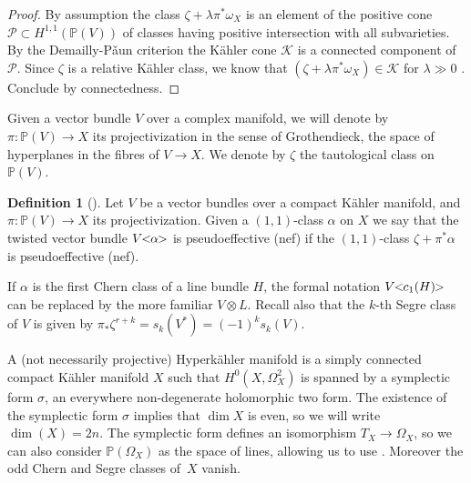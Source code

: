 \documentclass[JEP,XML,SOM,Unicode,NoEqCountersInSection,published]{cedram}
\let\mathcal\mathscr
\theoremstyle{plain}
\theoremstyle{definition}
\newtheorem{definition}[theorem]{Definition}
\newcommand{\PP}{\ensuremath{\mathbb{P}}}
\newcommand{\holom}[3]{\ensuremath{#1:#2\to #3}}
\begin{document}
\begin{proof}
By assumption the class $\zeta+ \lambda \pi^* \omega_X$ is an element of the
positive cone $\mathcal P \subset H^{1,1}(\PP(V))$ of classes having positive intersection with all subvarieties. By the Demailly-P\v aun criterion \cite[Th.\,0.1]{DP04}
the Kähler cone $\mathcal K$ is a connected component of $\mathcal P$.
Since $\zeta$ is a relative Kähler class, we know that $(\zeta+ \lambda \pi^* \omega_X) \in \mathcal K$ for $\lambda \gg 0$ \cite[Proof of Prop.\,3.18]{Voi02}. Conclude by connectedness.
\end{proof}

Given a vector bundle $V$ over a complex manifold, we will denote by
$\holom{\pi}{\PP(V)}{X}$ its projectivization in the sense of Grothendieck, \ie
the space of hyperplanes in the fibres of $V \to X$. We denote by $\zeta$ the tautological class on $\PP(V)$.

\begin{definition}[{\cite[\S 6.2]{Laz04b}}]\label{definitionpseff} 
Let $V$ be a vector bundles over a compact Kähler manifold, and $\holom{\pi}{\PP(V)}{X}$ its projectivization. Given a $(1,1)$-class $\alpha$ on $X$ we say that the twisted vector bundle
$V\hspace{-0.8ex}<\hspace{-0.8ex}\alpha\hspace{-0.8ex}>$ is pseudoeffective (\resp nef) if
the $(1,1)$-class $\zeta+\pi^* \alpha$ is pseudoeffective (\resp nef).
\end{definition}

If $\alpha$ is the first Chern class of a line bundle $H$, the formal notation $V\hspace{-0.8ex}<\hspace{-0.8ex}c_1(H)\hspace{-0.8ex}>$ can be replaced by the more familiar
$V \otimes L$. Recall also \cite[Ex.\,8.3.5]{Laz04b} that the $k$-th Segre class of $V$ is given by $\pi_* \zeta^{r+k}= s_k(V^*) = (-1)^k s_k(V)$.

A (not necessarily projective) Hyperkähler manifold is a simply connected compact Kähler manifold $X$ such that $H^0(X, \Omega_X^2)$ is spanned by a symplectic form $\sigma$, \ie an everywhere non-degenerate holomorphic two form.
The existence of the symplectic form $\sigma$ implies that $\dim X$ is even, so we will write $\dim(X)=2n$.
The symplectic form defines an isomorphism $T_X \to \Omega_X$, so
we can also consider $\PP(\Omega_X)$ as the
space of lines, allowing us to use \eg \cite{Kob87}.
Moreover the odd Chern and Segre classes of~$X$ vanish.
\end{document}
